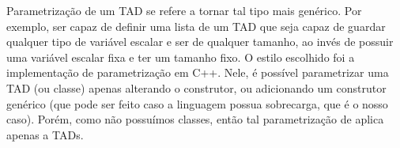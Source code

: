 
Parametrização de um TAD se refere a tornar tal tipo mais genérico. Por exemplo, ser capaz de definir uma lista de um TAD que seja capaz de guardar qualquer tipo de variável escalar e ser de qualquer tamanho, ao invés de possuir uma variável escalar fixa e ter um tamanho fixo. O estilo escolhido foi a implementação de parametrização em C++. Nele, é possível parametrizar uma TAD (ou classe) apenas alterando o construtor, ou adicionando um construtor genérico (que pode ser feito caso a linguagem possua sobrecarga, que é o nosso caso). Porém, como não possuímos classes, então tal parametrização de aplica apenas a TADs.